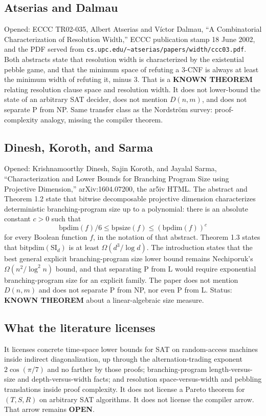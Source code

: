 \documentclass[11pt]{article}
\begin{document}
\subsection*{Atserias and Dalmau}
Opened: ECCC TR02-035, Albert Atserias and V\'ictor Dalmau, ``A Combinatorial Characterization of Resolution Width,'' ECCC publication stamp 18 June 2002, and the PDF served from \texttt{cs.upc.edu/\textasciitilde atserias/papers/width/ccc03.pdf}.
Both abstracts state that resolution width is characterized by the existential pebble game, and that the minimum space of refuting a 3-CNF is always at least the minimum width of refuting it, minus 3.
That is a \textbf{KNOWN THEOREM} relating resolution clause space and resolution width.
It does not lower-bound the state of an arbitrary SAT decider, does not mention \(D(n,m)\), and does not separate P from NP.
Same transfer class as the Nordstr\"om survey: proof-complexity analogy, missing the compiler theorem.

\subsection*{Dinesh, Koroth, and Sarma}
Opened: Krishnamoorthy Dinesh, Sajin Koroth, and Jayalal Sarma, ``Characterization and Lower Bounds for Branching Program Size using Projective Dimension,'' arXiv:1604.07200, the ar5iv HTML.
The abstract and Theorem 1.2 state that bitwise decomposable projective dimension characterizes deterministic branching-program size up to a polynomial: there is an absolute constant \(c>0\) such that
\[
\mathrm{bpdim}(f)/6\le\mathrm{bpsize}(f)\le(\mathrm{bpdim}(f))^c
\]
for every Boolean function \(f\), in the notation of that abstract.
Theorem 1.3 states that \(\mathrm{bitpdim}(\mathrm{SI}_d)\) is at least \(\Omega(d^3/\log d)\).
The introduction states that the best general explicit branching-program size lower bound remains Nechiporuk's \(\Omega(n^2/\log^2 n)\) bound, and that separating P from L would require exponential branching-program size for an explicit family.
The paper does not mention \(D(n,m)\) and does not separate P from NP, nor even P from L.
Status: \textbf{KNOWN THEOREM} about a linear-algebraic size measure.

\subsection*{What the literature licenses}
It licenses concrete time-space lower bounds for SAT on random-access machines inside indirect diagonalization, up through the alternation-trading exponent \(2\cos(\pi/7)\) and no farther by those proofs; branching-program length-versus-size and depth-versus-width facts; and resolution space-versus-width and pebbling translations inside proof complexity.
It does not license a Pareto theorem for \((T,S,R)\) on arbitrary SAT algorithms.
It does not license the compiler arrow.
That arrow remains \textbf{OPEN}.
\end{document}
